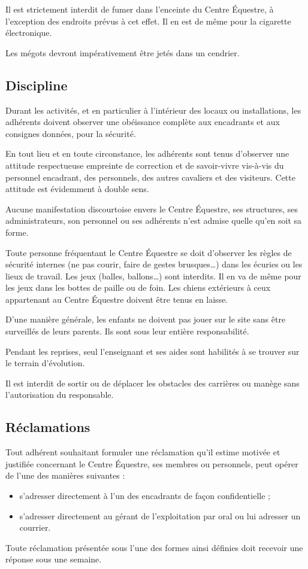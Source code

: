 \documentclass[11pt,a4paper]{article}
\begin{document}
   Il est strictement interdit de fumer dans l'enceinte du Centre Équestre, à l'exception des endroits prévus à cet effet.
   Il en est de même pour la cigarette électronique.

   Les mégots devront impérativement être jetés dans un cendrier.

   \subsection{Discipline}\label{subsec:discipline}
   Durant les activités, et en particulier à l'intérieur des locaux ou installations, les adhérents doivent observer une obéissance complète aux encadrants et aux consignes données, pour la sécurité.

   En tout lieu et en toute circonstance, les adhérents sont tenus d'observer une attitude respectueuse empreinte de correction et de savoir-vivre vis-à-vis du personnel encadrant, des personnels, des autres cavaliers et des visiteurs.
   Cette attitude est évidemment à double sens.

   Aucune manifestation discourtoise envers le Centre Équestre, ses structures, ses administrateurs, son personnel ou ses adhérents n'est admise quelle qu'en soit sa forme.

   Toute personne fréquentant le Centre Équestre se doit d'observer les règles de sécurité internes (ne pas courir, faire de gestes brusques\dots) dans les écuries ou les lieux de travail.
   Les jeux (balles, ballons\dots) sont interdits.
   Il en va de même pour les jeux dans les bottes de paille ou de foin.
   Les chiens extérieurs à ceux appartenant au Centre Équestre doivent être tenus en laisse.

   D'une manière générale, les enfants ne doivent pas jouer sur le site sans être surveillés de leurs parents.
   Ils sont sous leur entière responsabilité.

   Pendant les reprises, seul l'enseignant et ses aides sont habilités à se trouver sur le terrain d'évolution.

   Il est interdit de sortir ou de déplacer les obstacles des carrières ou manège sans l'autorisation du responsable.

   \subsection{Réclamations}\label{subsec:reclamations}
   Tout adhérent souhaitant formuler une réclamation qu'il estime motivée et justifiée concernant le Centre Équestre, ses membres ou personnels, peut opérer de l'une des manières suivantes :
   \begin{itemize}
      \item
      s'adresser directement à l'un des encadrants de façon confidentielle ;
      \item
      s'adresser directement au gérant de l'exploitation par oral ou lui adresser un courrier.
   \end{itemize}
   Toute réclamation présentée sous l'une des formes ainsi définies doit recevoir une réponse sous une semaine.
\end{document}

